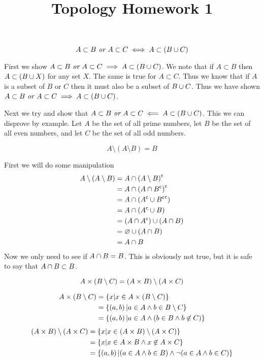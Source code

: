 \documentclass{article}
\title{Topology Homework 1}
\begin{document}
\maketitle

\[A\subset B \textit{ or } A \subset C \iff A \subset (B \cup C)\]

First we show $A\subset B \textit{ or } A \subset C \implies A \subset (B \cup C)$. We note that if $A \subset B$ then $A \subset (B \cup X)$ for any set $X$. The same is true for $A \subset C$. Thus we know that if $A$ is a subset of $B$ or $C$ then it must also be a subset of $B \cup C$. Thus we have shown $A\subset B \textit{ or } A \subset C \implies A \subset (B \cup C)$.

Next we try and show that $A\subset B \textit{ or } A \subset C \impliedby A \subset (B \cup C)$. This we can disprove by example. Let $A$ be the set of all prime numbers, let $B$ be the set of all even numbers, and let $C$ be the set of all odd numbers.

\[A\setminus(A\setminus B) = B\]

First we will do some manipulation
\begin{align*}
A \setminus (A \setminus B) &= A \cap {(A \setminus B)}^{\mathsf{c}} \\
&= A \cap {\left(A \cap{B}^{\mathsf{c}} \right)}^{\mathsf{c}} \\
&= A \cap \left({A}^{\mathsf{c}} \cup {{B}^{\mathsf{c}}}^{\mathsf{c}}\right) \\
&= A \cap \left({A}^{\mathsf{c}} \cup B\right) \\
&= \left(A \cap {A}^{\mathsf{c}}\right) \cup \left( A \cap B \right) \\
&= \varnothing \cup (A \cap B) \\
&= A \cap B
\end{align*}
Now we only need to see if $A \cap B = B$. This is obviously not true, but it is safe to say that $A \cap B \subset B$.

\[A \times (B \setminus C) = (A \times B) \setminus (A \times C)\]

\begin{align*}
A \times (B \setminus C) &= \left\{ {x | x \in A \times (B \setminus C)} \right\} \\
&= \left\{ {\left( a , b \right) | a \in A \land b \in B \setminus C} \right\} \\
&= \left\{ {\left( a , b \right) | a \in A \land (b \in B \land b \not\in C)} \right\}
\end{align*}
\begin{align*}
(A \times B) \setminus (A \times C) &= \left\{ {x | x \in (A \times B)\setminus(A \times C)} \right\} \\
&= \left\{ {x | x \in A \times B \land x \not\in A \times C} \right\}\\
&= \left\{ {\left( a , b \right) | (a \in A \land b \in B)\land \lnot(a \in A \land b \in C)} \right\}
\end{align*}
\end{document}
